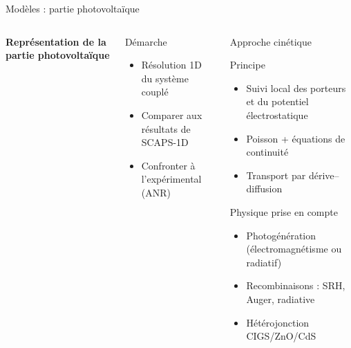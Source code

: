 \begin{frame}[t]{Modèles : partie photovoltaïque}

  \vspace{-1em}

  \begin{columns}[T,onlytextwidth]

\begin{pccard}
  \centering
  \figschemaphotovoltaique
  {\scriptsize\bfseries\color{pcNavy}
   Représentation de la partie photovoltaïque}
\end{pccard}


\begin{pcbanner}{Démarche}
  \begin{itemize}\footnotesize
    \item Résolution 1D du système couplé
    \item Comparer aux résultats de SCAPS-1D
    \item Confronter à l'expérimental (ANR)
  \end{itemize}
\end{pcbanner}

    
\vspace{-0.5em}
\begin{pcbanner}{Approche cinétique}
  \vspace{0.45em}
  \begin{pcbannerlight}{Principe}
    \vspace{0.3em}
    \begin{itemize}\footnotesize
      \item Suivi local des porteurs et du potentiel électrostatique
      \item Poisson + équations de continuité
      \item Transport par dérive--diffusion
    \end{itemize}
  \end{pcbannerlight}

  \vspace{0.35em}

  \begin{pcbannerlight}{Physique prise en compte}
    \vspace{0.3em}
    \begin{itemize}\footnotesize
      \item Photogénération (électromagnétisme ou radiatif)
      \item Recombinaisons : SRH, Auger, radiative
      \item Hétérojonction CIGS/ZnO/CdS
    \end{itemize}
  \end{pcbannerlight}
  \vspace{0.2em}
\end{pcbanner}


\end{columns}
\end{frame}

